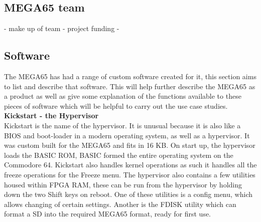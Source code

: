 \subsection{MEGA65 team}
- make up of team
- project funding
- 


\subsection{Software}
The MEGA65 has had a range of custom software created for it, this section aims to list and describe that software. This will help further describe the MEGA65 as a product as well as give some explanation of the functions available to these pieces of software which will be helpful to carry out the use case studies.\\

\textbf{Kickstart - the Hypervisor}\\
Kickstart is the name of the hypervisor. It is unusual because it is also like a BIOS and boot-loader in a modern operating system, as well as a hypervisor. It was custom built for the MEGA65 and fits in 16 KB. On start up, the hypervisor loads the BASIC ROM, BASIC formed the entire operating system on the Commodore 64. Kickstart also handles kernel operations as such it handles all the freeze operations for the Freeze menu. The hypervisor also contains a few utilities housed within FPGA RAM, these can be run from the hypervisor by holding down the two Shift keys on reboot. One of these utilities is a config menu, which allows changing of certain settings. Another is the FDISK utility which can format a SD into the required MEGA65 format, ready for first use.\\

